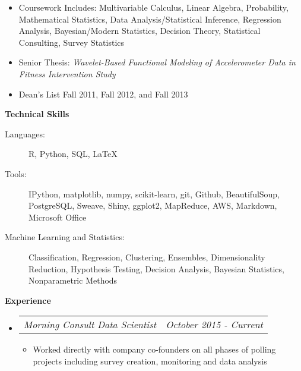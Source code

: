 \documentclass[letterpaper,12pt]{article}
\makeatletter
\newcommand{\resitem}[1]{\item #1 \vspace{-2pt}}
\newcommand{\resheading}[1]{{\large \colorbox{mygrey}{\begin{minipage}{\textwidth}{\textbf{#1 \vphantom{p\^{E}}}}\end{minipage}}}}
\newcommand{\ressubsubheading}[2]{
\begin{tabular*}{6.5in}{l@{\extracolsep{\fill}}r}
		\textit{#1} & \textit{#2} \\
\end{tabular*}\vspace{-6pt}}
\makeatother
\begin{document}
				{ \footnotesize
				\begin{itemize}
					\resitem{Coursework Includes: Multivariable Calculus, Linear Algebra, Probability, Mathematical Statistics, Data Analysis/Statistical Inference, Regression Analysis, Bayesian/Modern Statistics, Decision Theory, Statistical Consulting, Survey Statistics}
					\resitem{Senior Thesis: \textit{Wavelet-Based Functional Modeling of Accelerometer Data in Fitness Intervention Study}} 
					\resitem{Dean's List Fall 2011, Fall 2012, and Fall 2013} 
				\end{itemize}


\resheading{Technical Skills}
	\begin{description}
		\item[Languages:] { \footnotesize R, Python, SQL, \LaTeX
		}
		\item[Tools:] { \footnotesize IPython, matplotlib, numpy, scikit-learn, git, Github, BeautifulSoup, PostgreSQL, Sweave, Shiny, ggplot2, MapReduce, AWS, Markdown, Microsoft Office
		}
		\item[Machine Learning and Statistics:] { \footnotesize Classification, Regression, Clustering, Ensembles, Dimensionality Reduction, Hypothesis Testing, Decision Analysis, Bayesian Statistics, Nonparametric Methods
		}
	\end{description} %

\resheading{Experience}
	\begin{itemize}
		\item 
			\ressubsubheading{Morning Consult Data Scientist}{October 2015 - Current}
				{ \footnotesize
				\begin{itemize}
					\resitem{Worked directly with company co-founders on all phases of polling projects including survey creation, monitoring and data analysis}


\end{itemize}}
\end{itemize}}
\end{document}
